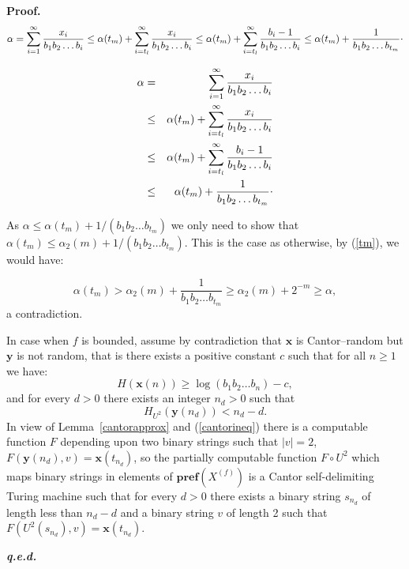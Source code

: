 \documentclass[11pt,a4paper,twoside]{article}
\def \pref#1{{\mathbf{pref}({#1})}}
\newcommand{\x}{{\mathbf x}}
\newcommand{\y}{{\mathbf y}}
\def \XF  {X^{(f)}}
\def \raisedot {\raisebox{.5ex}{.}}
\newenvironment{proof}{\textbf{Proof.\,}}{\hfill\textbf{\itshape
q.e.d.}\par}
\begin{document}
\begin{proof}
\[\alpha  =   \sum_{i=1}^{\infty} \frac{x_{i}}{b_{1}b_{2}\ldots b_{i}}
 \le   \alpha (t_{m}) + \sum_{i=t_{l}}^{\infty}
\frac{x_{i}}{b_{1}b_{2}\ldots b_{i}}
 \le  \alpha (t_{m}) + \sum_{i=t_{l}}^{\infty}
\frac{b_{i}-1}{b_{1}b_{2}\ldots b_{i}} \\
 \le  \alpha (t_{m}) + \frac{1}{b_{1}b_{2}\ldots b_{t_{m}}} \raisedot
\]

\begin{eqnarray*}
\alpha & = &  \sum_{i=1}^{\infty} \frac{x_{i}}{b_{1}b_{2}\ldots b_{i}} \\
& \le &  \alpha (t_{m}) + \sum_{i=t_{l}}^{\infty}
\frac{x_{i}}{b_{1}b_{2}\ldots b_{i}} \\
& \le & \alpha (t_{m}) + \sum_{i=t_{l}}^{\infty}
\frac{b_{i}-1}{b_{1}b_{2}\ldots b_{i}} \\
& \le & \alpha (t_{m}) + \frac{1}{b_{1}b_{2}\ldots b_{t_{m}}} \raisedot
\end{eqnarray*}
\fi

As $\alpha \le \alpha (t_{m}) + 1/(b_{1}b_{2}\ldots b_{t_{m}})$ we only need
to show that $\alpha (t_{m}) \le \alpha_{2} (m)+ 1/(b_{1}b_{2}\ldots
b_{t_{m}})$. This is the case as otherwise, by  (\ref{tm}), we would have:

\[\alpha (t_{m}) > \alpha_{2} (m) +
 \frac{1}{b_{1}b_{2}\ldots b_{t_{m}}} \ge \alpha_{2} (m) + 2^{-m}
 \ge \alpha,\]
 a contradiction.


In case when $f$ is bounded, assume by contradiction that $\x$ is
Cantor--random but $\y$ is not random, that is there exists a positive
constant $c$ such that for all $n\ge 1$ we have:
\begin{equation}
\label{crand}
H(\x(n)) \ge \log (b_{1}b_{2}\ldots b_{n}) -c,
\end{equation}
and for every $d>0$ there exists an integer $n_{d}>0$ such that
\begin{equation}
\label{not-brand}
H_{U^{2}} (\y(n_{d})) < n_{d} - d.
\end{equation}
In view of Lemma~\ref{cantorapprox} and (\ref{cantorineq}) there is a
computable function $F$ depending upon two binary strings such that $|v|=2$,
$F(\y (n_{d}), v) =
\x (t_{n_{d}})$, so the partially computable function $F \circ U^{2}$
which
maps binary strings in elements of $\pref{\XF}$ is a
Cantor self-delimiting
Turing machine such that for every $d>0$ there exists a binary string
$s_{n_{d}}$ of length less than
$n_{d} - d$ and a binary string $v$ of length  2 such that
$F(U^{2}(s_{n_{d}}), v) = \x(t_{n_{d}})$.


\end{proof}
\end{document}

